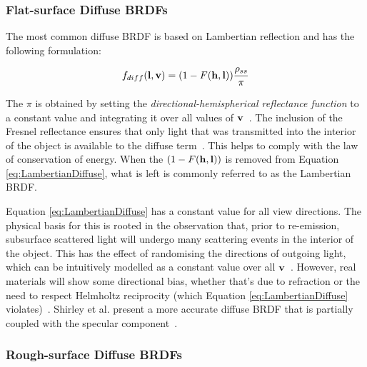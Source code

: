 \subsubsection{Flat-surface Diffuse BRDFs}

The most common diffuse BRDF is based on Lambertian reflection and has the following formulation:

\vspace{-0.4cm}

\begin{equation} \label{eq:LambertianDiffuse}
	f_{diff}(\mathbf{l}, \mathbf{v}) = (1 - F(\mathbf{h}, \mathbf{l}))\frac{\rho_{ss}}{\pi}
\end{equation}

The \begin{math}\pi\end{math} is obtained by setting the \textit{directional-hemispherical reflectance function} to a constant value and integrating it over all values of \begin{math}\mathbf{v}\end{math}~\cite{RTR4}. The inclusion of the Fresnel reflectance ensures that only light that was transmitted into the interior of the object is available to the diffuse term~\cite{ShirleySimpleConservationOfEnergy}. This helps to comply with the law of conservation of energy. When the \begin{math}(1 - F(\mathbf{h}, \mathbf{l}))\end{math} is removed from Equation \ref{eq:LambertianDiffuse}, what is left is commonly referred to as the Lambertian BRDF.

Equation \ref{eq:LambertianDiffuse} has a constant value for all view directions. The physical basis for this is rooted in the observation that, prior to re-emission, subsurface scattered light will undergo many scattering events in the interior of the object. This has the effect of randomising the directions of outgoing light, which can be intuitively modelled as a constant value over all \begin{math}\mathbf{v}\end{math}~\cite{HammonBRDF}. However, real materials will show some directional bias, whether that's due to refraction or the need to respect Helmholtz reciprocity (which Equation \ref{eq:LambertianDiffuse} violates)~\cite{RTR4}. Shirley et al. present a more accurate diffuse BRDF that is partially coupled with the specular component~\cite{PractitionersReflectionModels}.

\subsubsection{Rough-surface Diffuse BRDFs}

